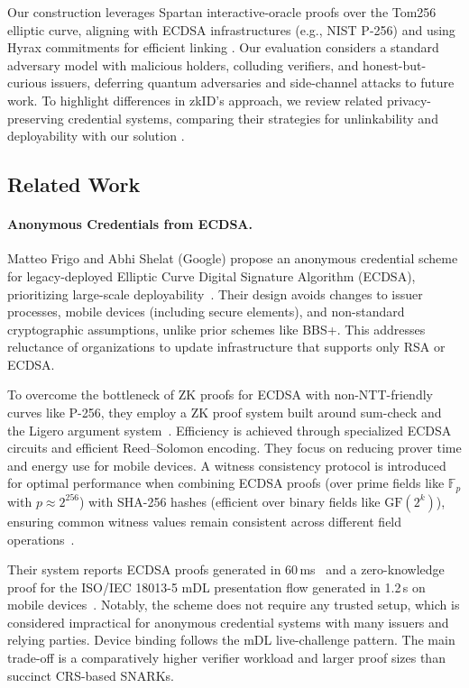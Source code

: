 Our construction leverages Spartan interactive-oracle proofs over the Tom256 elliptic curve, aligning with ECDSA infrastructures (e.g., NIST P-256) and using Hyrax commitments for efficient linking \cite{C:Setty20,cryptoeprint:2017/1132}. Our evaluation considers a standard adversary model with malicious holders, colluding verifiers, and honest-but-curious issuers, deferring quantum adversaries and side-channel attacks to future work. To highlight differences in zkID’s approach, we review related privacy-preserving credential systems, comparing their strategies for unlinkability and deployability with our solution \cite{cryptoeprint:2024/2010,cryptoeprint:2024/2013}.

\subsection{Related Work}

\paragraph{Anonymous Credentials from ECDSA.}
Matteo Frigo and Abhi Shelat (Google) propose an anonymous credential scheme for legacy-deployed Elliptic Curve Digital Signature Algorithm (ECDSA), prioritizing large-scale deployability~\cite{cryptoeprint:2024/2010}. Their design avoids changes to issuer processes, mobile devices (including secure elements), and non-standard cryptographic assumptions, unlike prior schemes like BBS+. This addresses reluctance of organizations to update infrastructure that supports only RSA or ECDSA.

To overcome the bottleneck of ZK proofs for ECDSA with non-NTT-friendly curves like P-256, they employ a ZK proof system built around sum-check and the Ligero argument system~\cite{CCS:AHIV17}. Efficiency is achieved through specialized ECDSA circuits and efficient Reed–Solomon encoding. They focus on reducing prover time and energy use for mobile devices. A witness consistency protocol is introduced for optimal performance when combining ECDSA proofs (over prime fields like $\mathbb{F}_{p}$ with $p\approx 2^{256}$) with SHA-256 hashes (efficient over binary fields like $\mathrm{GF}(2^k)$), ensuring common witness values remain consistent across different field operations~\cite[\S3.4]{cryptoeprint:2024/2010}.

Their system reports ECDSA proofs generated in 60\,ms~\cite[\S5.3]{cryptoeprint:2024/2010} and a zero-knowledge proof for the ISO/IEC 18013-5 mDL presentation flow generated in 1.2\,s on mobile devices~\cite[\S6.2]{cryptoeprint:2024/2010}. Notably, the scheme does not require any trusted setup, which is considered impractical for anonymous credential systems with many issuers and relying parties. Device binding follows the mDL live-challenge pattern. The main trade-off is a comparatively higher verifier workload and larger proof sizes than succinct CRS-based SNARKs.

